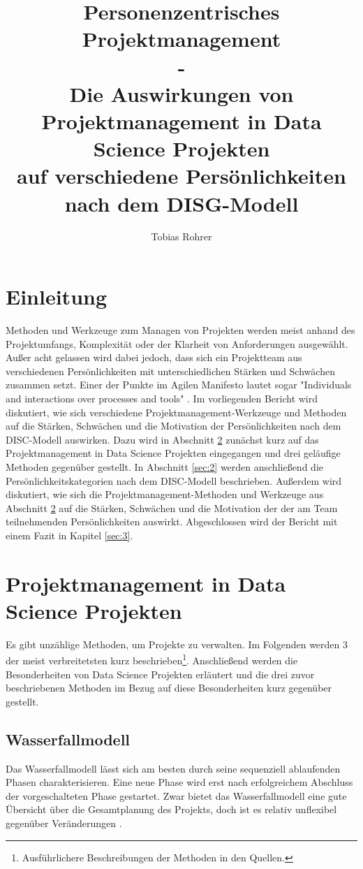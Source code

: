 \documentclass[twocolumn,10pt]{asme2ej}
\title{%
	Personenzentrisches Projektmanagement\\
	\large 
	- \\
	Die Auswirkungen von Projektmanagement in Data Science Projekten\\ 
   auf verschiedene Persönlichkeiten nach dem DISG-Modell}
\author{Tobias Rohrer
    \affiliation{
	Hochschule Darmstadt\\
	Data Science (Master)\\
    Email: sttorohr@stud.h-da.de
    }	
}
\begin{document}
\maketitle    

\begin{abstract}


\end{abstract}

\section{Einleitung}
Methoden und Werkzeuge zum Managen von Projekten werden meist anhand des Projektumfangs, Komplexität oder der Klarheit von Anforderungen ausgewählt. Außer acht gelassen wird dabei jedoch, dass sich ein Projektteam aus verschiedenen Persönlichkeiten mit unterschiedlichen Stärken und Schwächen zusammen setzt. Einer der Punkte im Agilen Manifesto lautet sogar "Individuals and interactions over processes and tools" \cite{beck2001agile}. Im vorliegenden Bericht wird diskutiert, wie sich verschiedene Projektmanagement-Werkzeuge und Methoden auf die Stärken, Schwächen und die Motivation der Persönlichkeiten nach dem DISC-Modell auswirken. Dazu wird in Abschnitt \ref{sec:1} zunächst kurz auf das Projektmanagement in Data Science Projekten eingegangen und drei geläufige Methoden gegenüber gestellt. In Abschnitt \ref{sec:2} werden anschließend die Persönlichkeitskategorien nach dem DISC-Modell beschrieben. Außerdem wird diskutiert, wie sich die Projektmanagement-Methoden und Werkzeuge aus Abschnitt \ref{sec:1} auf die Stärken, Schwächen und die Motivation der der am Team teilnehmenden Persönlichkeiten auswirkt. Abgeschlossen wird der Bericht mit einem Fazit in Kapitel \ref{sec:3}.


\section{Projektmanagement in Data Science Projekten}\label{sec:1}
Es gibt unzählige Methoden, um Projekte zu verwalten. Im Folgenden werden 3 der meist verbreitetsten kurz beschrieben\footnote{Ausführlichere Beschreibungen der Methoden in den Quellen.}. Anschließend werden die Besonderheiten von Data Science Projekten erläutert und die drei zuvor beschriebenen Methoden im Bezug auf diese Besonderheiten kurz gegenüber gestellt.

\subsection{Wasserfallmodell}
Das Wasserfallmodell lässt sich am besten durch seine sequenziell ablaufenden Phasen charakterisieren. Eine neue Phase wird erst nach erfolgreichem Abschluss der vorgeschalteten Phase gestartet. Zwar bietet das Wasserfallmodell eine gute Übersicht über die Gesamtplanung des Projekts, doch ist es relativ unflexibel gegenüber Veränderungen \cite{Wasserfall}.
\end{document}
